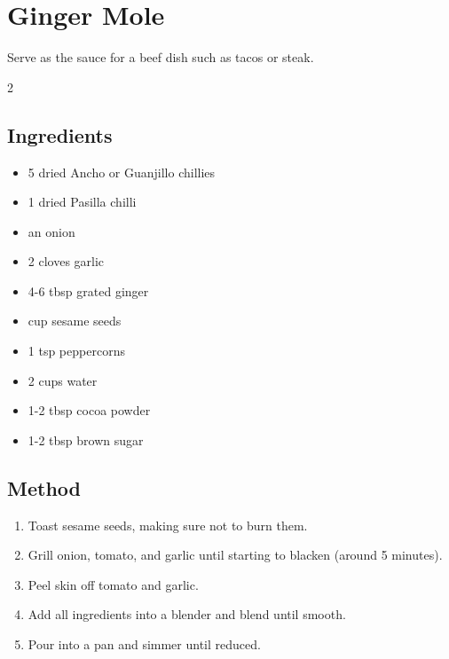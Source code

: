 \clearpage
\section{Ginger Mole}


Serve as the sauce for a beef dish such as tacos or steak.

\begin{multicols}{2}
\subsection{Ingredients}
  \begin{itemize}
    \item 5 dried Ancho or Guanjillo chillies
    \item 1 dried Pasilla chilli
    \item {} an onion
    \item 2 cloves garlic
    \item 4-6 tbsp grated ginger
    \item {} cup sesame seeds
    \item 1 tsp peppercorns
    \item 2 cups water
    \item 1-2 tbsp cocoa powder
    \item 1-2 tbsp brown sugar
  \end{itemize}
\vfill\null
\columnbreak
\subsection{Method}
\begin{enumerate}
  \item Toast sesame seeds, making sure not to burn them.
  \item Grill onion, tomato, and garlic until starting to blacken (around 5 minutes).
  \item Peel skin off tomato and garlic.
  \item Add all ingredients into a blender and blend until smooth.
  \item Pour into a pan and simmer until reduced.
\end{enumerate}
\end{multicols}
